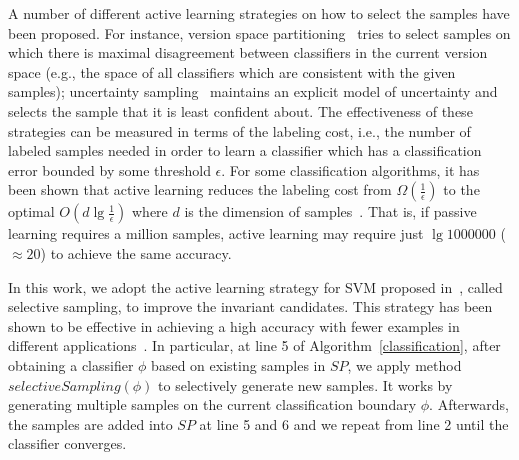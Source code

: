 A number of different active learning strategies on how to select the samples have been proposed. For instance, version space partitioning~\cite{DBLP:conf/icml/RuffD89} tries to select samples on which there is maximal disagreement between classifiers in the current version space (e.g., the space of all classifiers which are consistent with the given samples); uncertainty sampling~\cite{DBLP:conf/sigir/LewisG94} maintains an explicit model of uncertainty and selects the sample that it is least confident about. The effectiveness of these strategies can be measured in terms of the labeling cost, i.e., the number of labeled samples needed in order to learn a classifier which has a classification error bounded by some threshold $\epsilon$. For some classification algorithms, it has been shown that active learning reduces the labeling cost from $\Omega(\frac{1}{\epsilon})$ to the optimal $O(d\lg\frac{1}{\epsilon})$ where $d$ is the dimension of samples~\cite{DBLP:conf/nips/Gilad-BachrachNT05,DBLP:conf/nips/Dasgupta05}. That is, if passive learning requires a million samples, active learning may require just $\lg 1000000$ ($\approx 20$) to achieve the same accuracy.

In this work, we adopt the active learning strategy for SVM proposed in~\cite{DBLP:conf/icml/SchohnC00}, called selective sampling, to improve the invariant candidates. This strategy has been shown to be effective in achieving a high accuracy with fewer examples in different applications~\cite{DBLP:conf/mm/TongC01,DBLP:journals/jmlr/TongK01}. In particular,
at line 5 of Algorithm~\ref{classification}, after obtaining a classifier $\phi$ based on existing samples in $SP$, we apply method $selectiveSampling(\phi)$ to selectively generate new samples. It works by generating multiple samples on the current classification boundary $\phi$. Afterwards, the samples are added into $SP$ at line 5 and 6 and we repeat from line 2 until the classifier converges.
%

